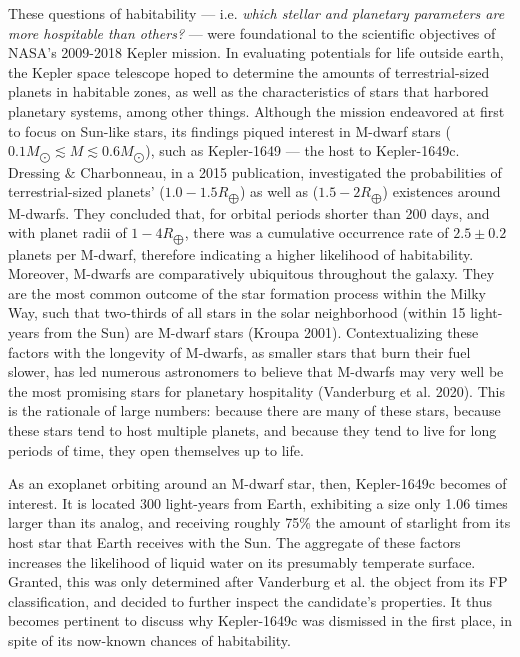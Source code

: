 \documentclass[onecolumn, 12pt]{article}
\begin{document}
These questions of habitability — i.e. \textit{which stellar and planetary parameters are more hospitable than others?} — were foundational to the scientific objectives of NASA's 2009-2018 Kepler mission. In evaluating potentials for life outside earth, the Kepler space telescope hoped to determine the amounts of terrestrial-sized planets in habitable zones, as well as the characteristics of stars that harbored planetary systems, among other things. Although the mission endeavored at first to focus on Sun-like stars, its findings piqued interest in M-dwarf stars ($0.1M_{\bigodot} \lesssim M \lesssim 0.6M_{\bigodot}$), such as Kepler-1649 — the host to Kepler-1649c. Dressing $\&$ Charbonneau, in a 2015 publication, investigated the probabilities of terrestrial-sized planets' ($1.0-1.5 R_{\bigoplus}$) as well as  ($1.5-2 R_{\bigoplus}$) existences around M-dwarfs. They concluded that, for orbital periods shorter than 200 days, and with planet radii of $1-4 R_{\bigoplus}$, there was a cumulative occurrence rate of $2.5 \pm 0.2$ planets per M-dwarf, therefore indicating a higher likelihood of habitability. Moreover, M-dwarfs are comparatively ubiquitous throughout the galaxy. They are the most common outcome of the star formation process within the Milky Way, such that two-thirds of all stars in the solar neighborhood (within 15 light-years from the Sun) are M-dwarf stars (Kroupa 2001). Contextualizing these factors with the longevity of M-dwarfs, as smaller stars that burn their fuel slower, has led numerous astronomers to believe that M-dwarfs may very well be the most promising stars for planetary hospitality (Vanderburg et al. 2020). This is the rationale of large numbers: because there are many of these stars, because these stars tend to host multiple planets, and because they tend to live for long periods of time, they open themselves up to life.

As an exoplanet orbiting around an M-dwarf star, then, Kepler-1649c becomes of interest. It is located 300 light-years from Earth, exhibiting a size only 1.06 times larger than its analog, and receiving roughly 75$\%$ the amount of starlight from its host star that Earth receives with the Sun. The aggregate of these factors increases the likelihood of liquid water on its presumably temperate surface. Granted, this was only determined after Vanderburg et al.  the object from its FP classification, and decided to further inspect the candidate's properties. It thus becomes pertinent to discuss why Kepler-1649c was dismissed in the first place, in spite of its now-known chances of habitability.
\end{document}

